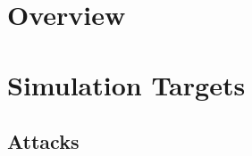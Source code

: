 




\coverpage{\TITLE}{\SUBTITLE}{\AUTHOR}{\DATE}{\SUBJECT}
\newpage
\backgroundbarvisiblefalse
\pagestyle{plain}



\newpage
\tableofcontents

\part{Overview} \label{sec:overview}


% 


\part{Simulation Targets}
\chapter{Attacks} \label{ch:attacks}

